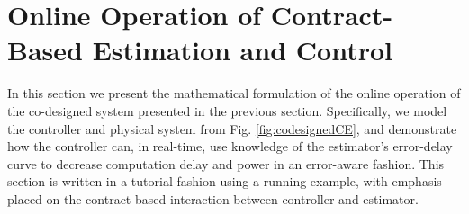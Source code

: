\section{Online Operation of Contract-Based Estimation and Control}
\label{controlProblem}
In this section we present the mathematical formulation of the online operation of the co-designed system presented in the previous section.
Specifically, we model the controller and physical system from Fig. \ref{fig:codesignedCE}, and demonstrate how the controller can, in real-time, use knowledge of the estimator's error-delay curve to decrease computation delay and power in an error-aware fashion.
This section is written in a tutorial fashion using a running example, with emphasis placed on the contract-based interaction between controller and estimator.


